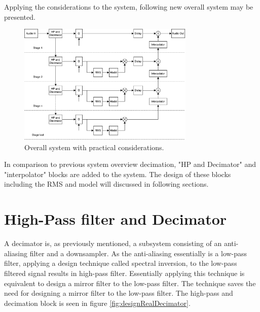 

Applying the considerations to the system, following new overall system may be presented.

\begin{figure}[H]
\centering
\includegraphics[width=0.75\textwidth]{figures/designRealBlock1.pdf}
\caption{Overall system with practical considerations.}
\label{fig:designRealBlock}
\end{figure}

In comparison to previous system overview decimation, "HP and Decimator" and "interpolator" blocks are added to the system. The design of these blocks including the RMS and model will discussed in following sections.


\section{High-Pass filter and Decimator}

A decimator is, as previously mentioned, a subsystem consisting of an anti-aliasing filter and a downsampler. As the anti-aliasing essentially is a low-pass filter, applying a design technique called spectral inversion, to the low-pass filtered signal results in high-pass filter. Essentially applying this technique is equivalent to design a mirror filter to the low-pass filter. The technique saves the need for designing a mirror filter to the low-pass filter. The high-pass and decimation block is seen in figure \autoref{fig:designRealDecimator}.

